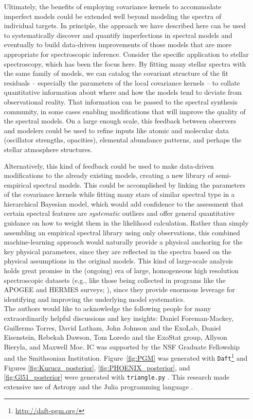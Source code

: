 \documentclass[iop,floatfix,numberedappendix,twocolappendix]{emulateapj}
\begin{document}
Ultimately, the benefits of employing covariance kernels to accommodate imperfect models could 
be extended well beyond modeling the spectra of individual targets.  In principle, the approach we 
have described here can be used to systematically discover and quantify imperfections in spectral 
models and eventually to build data-driven improvements of those models that are more appropriate 
for spectroscopic inference.  Consider the specific application to stellar spectroscopy, which has 
been the focus here.  By fitting many stellar spectra with the same family of models, we can 
catalog the covariant structure of the fit residuals -- especially the parameters of the local 
covariance kernels -- to collate quantitative information about where and how the models tend to 
deviate from observational reality.  That information can be passed to the spectral synthesis 
community, in some cases enabling modifications that will improve the quality of the spectral 
models.  On a large enough scale, this feedback between observers and modelers could be used to 
refine inputs like atomic and molecular data (oscillator strengths, opacities), elemental abundance 
patterns, and perhaps the stellar atmosphere structures.

Alternatively, this kind of feedback could be used to make data-driven modifications to the already
existing models, creating a new library of semi-empirical spectral models.  This could be
accomplished by linking the parameters of the covariance kernels while fitting many 
stars of similar spectral type in a hierarchical Bayesian model, which would add confidence to
the assessment that certain spectral features are {\it systematic} outliers and offer general
quantitative guidance on how to weight them in the likelihood calculation.  Rather than simply
assembling an empirical spectral library using only observations, this combined machine-learning
approach would naturally provide a physical anchoring for the key physical parameters, since they
are reflected in the spectra based on the physical assumptions in the original models.  This kind of
large-scale analysis holds great promise in the (ongoing) era of large, homogeneous high resolution
spectroscopic datasets (e.g., like those being collected in programs like the APOGEE and HERMES
surveys; \citealt{nidever12, zucker12}), since they provide enormous leverage for identifying and
improving the underlying model systematics. \\

\acknowledgments  The authors would like to acknowledge the following people
for many extraordinarily helpful discussions and key insights: Daniel
Foreman-Mackey, Guillermo Torres, David Latham, John Johnson and the ExoLab,
Daniel Eisenstein, Rebekah Dawson, Tom Loredo and the ExoStat group, Allyson
Bieryla, and Maxwell Moe.  IC was supported by the NSF Graduate Fellowship and
the Smithsonian Institution.  Figure~\ref{fig:PGM} was generated with
\texttt{Daft}\footnote{\url{http://daft-pgm.org/}} and Figures
\ref{fig:Kurucz_posterior}, \ref{fig:PHOENIX_posterior}, and
\ref{fig:Gl51_posterior} were generated with \texttt{triangle.py}
\citep{foreman-mackey14}.  This research made extensive use of Astropy
\citep{astropy13} and the Julia programming language \citep{julia12}.
\end{document}
